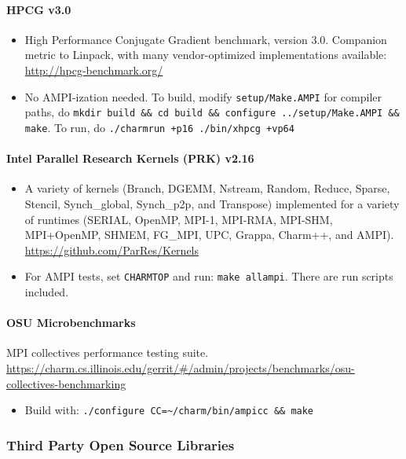\documentclass[10pt]{article}
\begin{document}
\paragraph{HPCG v3.0}
    \begin{itemize}
    \item
      High Performance Conjugate Gradient benchmark, version 3.0.
      Companion metric to Linpack, with many vendor-optimized
      implementations available: \url{http://hpcg-benchmark.org/}
    \item
      No AMPI-ization needed. To build, modify \texttt{setup/Make.AMPI} for
      compiler paths, do \texttt{mkdir build \&\& cd build \&\& configure
      ../setup/Make.AMPI \&\& make}. To run, do \texttt{./charmrun +p16
      ./bin/xhpcg +vp64}
    \end{itemize}

\paragraph{Intel Parallel Research Kernels (PRK) v2.16}
    \begin{itemize}
    \item
      A variety of kernels (Branch, DGEMM, Nstream, Random, Reduce,
      Sparse, Stencil, Synch\_global, Synch\_p2p, and Transpose)
      implemented for a variety of runtimes (SERIAL, OpenMP, MPI-1,
      MPI-RMA, MPI-SHM, MPI+OpenMP, SHMEM, FG\_MPI, UPC, Grappa,
      Charm++, and AMPI). \url{https://github.com/ParRes/Kernels}
    \item
      For AMPI tests, set \texttt{CHARMTOP} and run: \texttt{make allampi}. There are
      run scripts included.
    \end{itemize}

\paragraph{OSU Microbenchmarks}
	MPI collectives performance testing suite. \url{https://charm.cs.illinois.edu/gerrit/\#/admin/projects/benchmarks/osu-collectives-benchmarking}
    \begin{itemize}
    \item
       Build with:
      \texttt{./configure CC=\textasciitilde{}/charm/bin/ampicc
      \&\& make}
    \end{itemize}

\subsubsection{Third Party Open Source Libraries}
\end{document}
